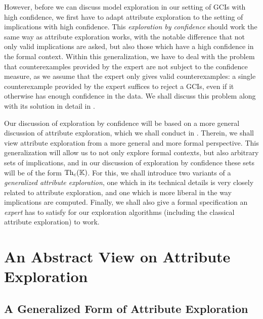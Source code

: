 However, before we can discuss model exploration in our setting of GCIs with high
confidence, we first have to adapt attribute exploration to the setting of implications
with high confidence.  This \emph{exploration by confidence} should work the same way as
attribute exploration works, with the notable difference that not only valid implications
are asked, but also those which have a high confidence in the formal context.  Within this
generalization, we have to deal with the problem that counterexamples provided by the
expert are not subject to the confidence measure, as we assume that the expert only gives
valid counterexamples: a single counterexample provided by the expert suffices to reject a
GCIs, even if it otherwise has enough confidence in the data.  We shall discuss this
problem along with its solution in detail in .

Our discussion of exploration by confidence will be based on a more general discussion of
attribute exploration, which we shall conduct in .  Therein, we
shall view attribute exploration from a more general and more formal perspective.  This
generalization will allow us to not only explore formal contexts, but also arbitrary sets
of implications, and in our discussion of exploration by confidence these sets will be of
the form $\operatorname{Th}_c({\mathbb{K}})$.  For this, we shall introduce two variants of a
\emph{generalized attribute exploration}, one which in its technical details is very
closely related to attribute exploration, and one which is more liberal in the way
implications are computed.  Finally, we shall also give a formal specification an
\emph{expert} has to satisfy for our exploration algorithms (including the classical
attribute exploration) to work.

\section{An Abstract View on Attribute Exploration}
\label{sec:an-abstract-view}

%
%

\subsection{A Generalized Form of Attribute Exploration}
\label{sec:gener-form-attr}


